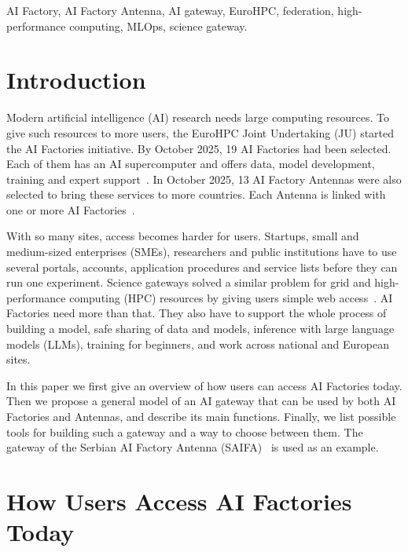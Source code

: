 \documentclass[conference,a4paper]{IEEEtran}
\begin{document}
\begin{IEEEkeywords}
AI Factory, AI Factory Antenna, AI gateway, EuroHPC, federation, high-performance computing, MLOps, science gateway.
\end{IEEEkeywords}

\section{Introduction}

Modern artificial intelligence (AI) research needs large computing resources. To give such resources to more users, the EuroHPC Joint Undertaking (JU) started the AI Factories initiative. By October 2025, 19 AI Factories had been selected. Each of them has an AI supercomputer and offers data, model development, training and expert support~\cite{eurohpc_aif,eurohpc_six_aif}. In October 2025, 13 AI Factory Antennas were also selected to bring these services to more countries. Each Antenna is linked with one or more AI Factories~\cite{eurohpc_antennas,eurohpc_antennas_page}.

With so many sites, access becomes harder for users. Startups, small and medium-sized enterprises (SMEs), researchers and public institutions have to use several portals, accounts, application procedures and service lists before they can run one experiment. Science gateways solved a similar problem for grid and high-performance computing (HPC) resources by giving users simple web access~\cite{wilkinsdiehr2007,hudak2018ood}. AI Factories need more than that. They also have to support the whole process of building a model, safe sharing of data and models, inference with large language models (LLMs), training for beginners, and work across national and European sites.

In this paper we first give an overview of how users can access AI Factories today. Then we propose a general model of an AI gateway that can be used by both AI Factories and Antennas, and describe its main functions. Finally, we list possible tools for building such a gateway and a way to choose between them. The gateway of the Serbian AI Factory Antenna (SAIFA)~\cite{cordis_saifa,saifa_d31} is used as an example.

\section{How Users Access AI Factories Today}
\end{document}
